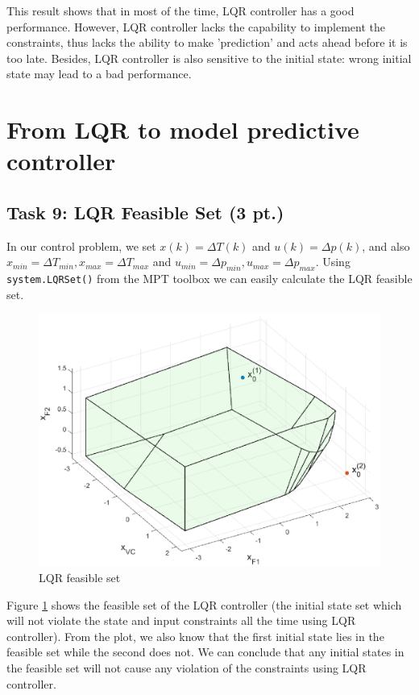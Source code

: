 \documentclass[a4paper,twoside,11pt]{article}
\numberwithin{equation}{section}
\begin{document}
This result shows that in most of the time, LQR controller has a good performance. However, LQR controller lacks the capability to implement the constraints, thus lacks the ability to make 'prediction' and acts ahead before it is too late. Besides, LQR controller is also sensitive to the initial state: wrong initial state may lead to a bad performance.

\newpage


\section{From LQR to model predictive controller}

\subsection{Task 9: LQR Feasible Set (3 pt.)}

In our control problem, we set $x(k) = \Delta T(k)$ and $u(k) = \Delta p(k)$, and also $x_{min} = \Delta T_{min}, x_{max} = \Delta T_{max}$ and $u_{min} = \Delta p_{min}, u_{max} = \Delta p_{max}$. Using \verb|system.LQRSet()| from the MPT toolbox we can easily calculate the LQR feasible set.

\begin{figure}[ht]
\centering
\includegraphics[scale = 0.6]{image/9.eps}
\caption{LQR feasible set}
\label{fig:5}
\end{figure}

Figure \ref{fig:5} shows the feasible set of the LQR controller (the initial state set which will not violate the state and input constraints all the time using LQR controller). From the plot, we also know that the first initial state lies in the feasible set while the second does not. We can conclude that any initial states in the feasible set will not cause any violation of the constraints using LQR controller.  
\end{document}
